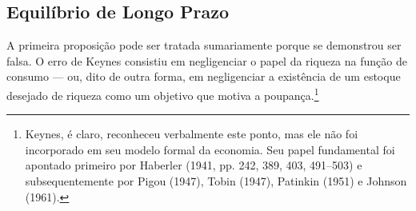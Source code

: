 \documentclass[12pt]{article}
\begin{document}
\subsection{Equilíbrio de Longo Prazo}

A primeira proposição pode ser tratada sumariamente porque se demonstrou ser falsa. O erro de Keynes consistiu em negligenciar o papel da riqueza na função de consumo — ou, dito de outra forma, em negligenciar a existência de um estoque desejado de riqueza como um objetivo que motiva a poupança.\footnote{Keynes, é claro, reconheceu verbalmente este ponto, mas ele não foi incorporado em seu modelo formal da economia. Seu papel fundamental foi apontado primeiro por Haberler (1941, pp. 242, 389, 403, 491–503) e subsequentemente por Pigou (1947), Tobin (1947), Patinkin (1951) e Johnson (1961).}
\end{document}
